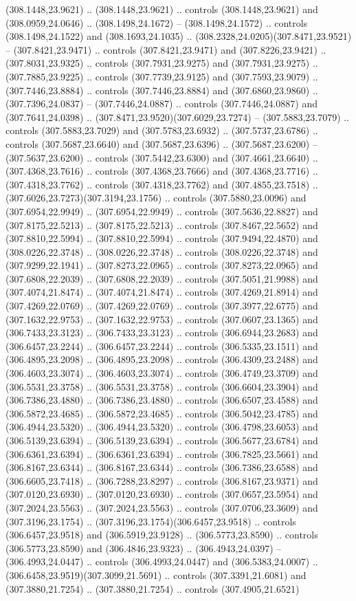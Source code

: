 (308.1448,23.9621) .. (308.1448,23.9621) .. controls (308.1448,23.9621) and (308.0959,24.0646) .. (308.1498,24.1672) -- (308.1498,24.1572) .. controls (308.1498,24.1522) and (308.1693,24.1035) .. (308.2328,24.0205)(307.8471,23.9521) -- (307.8421,23.9471) .. controls (307.8421,23.9471) and (307.8226,23.9421) .. (307.8031,23.9325) .. controls (307.7931,23.9275) and (307.7931,23.9275) .. (307.7885,23.9225) .. controls (307.7739,23.9125) and (307.7593,23.9079) .. (307.7446,23.8884) .. controls (307.7446,23.8884) and (307.6860,23.9860) .. (307.7396,24.0837) -- (307.7446,24.0887) .. controls (307.7446,24.0887) and (307.7641,24.0398) .. (307.8471,23.9520)(307.6029,23.7274) -- (307.5883,23.7079) .. controls (307.5883,23.7029) and (307.5783,23.6932) .. (307.5737,23.6786) .. controls (307.5687,23.6640) and (307.5687,23.6396) .. (307.5687,23.6200) -- (307.5637,23.6200) .. controls (307.5442,23.6300) and (307.4661,23.6640) .. (307.4368,23.7616) .. controls (307.4368,23.7666) and (307.4368,23.7716) .. (307.4318,23.7762) .. controls (307.4318,23.7762) and (307.4855,23.7518) .. (307.6026,23.7273)(307.3194,23.1756) .. controls (307.5880,23.0096) and (307.6954,22.9949) .. (307.6954,22.9949) .. controls (307.5636,22.8827) and (307.8175,22.5213) .. (307.8175,22.5213) .. controls (307.8467,22.5652) and (307.8810,22.5994) .. (307.8810,22.5994) .. controls (307.9494,22.4870) and (308.0226,22.3748) .. (308.0226,22.3748) .. controls (308.0226,22.3748) and (307.9299,22.1941) .. (307.8273,22.0965) .. controls (307.8273,22.0965) and (307.6808,22.2039) .. (307.6808,22.2039) .. controls (307.5051,21.9988) and (307.4074,21.8474) .. (307.4074,21.8474) .. controls (307.4269,21.8914) and (307.4269,22.0769) .. (307.4269,22.0769) .. controls (307.3977,22.6775) and (307.1632,22.9753) .. (307.1632,22.9753) .. controls (307.0607,23.1365) and (306.7433,23.3123) .. (306.7433,23.3123) .. controls (306.6944,23.2683) and (306.6457,23.2244) .. (306.6457,23.2244) .. controls (306.5335,23.1511) and (306.4895,23.2098) .. (306.4895,23.2098) .. controls (306.4309,23.2488) and (306.4603,23.3074) .. (306.4603,23.3074) .. controls (306.4749,23.3709) and (306.5531,23.3758) .. (306.5531,23.3758) .. controls (306.6604,23.3904) and (306.7386,23.4880) .. (306.7386,23.4880) .. controls (306.6507,23.4588) and (306.5872,23.4685) .. (306.5872,23.4685) .. controls (306.5042,23.4785) and (306.4944,23.5320) .. (306.4944,23.5320) .. controls (306.4798,23.6053) and (306.5139,23.6394) .. (306.5139,23.6394) .. controls (306.5677,23.6784) and (306.6361,23.6394) .. (306.6361,23.6394) .. controls (306.7825,23.5661) and (306.8167,23.6344) .. (306.8167,23.6344) .. controls (306.7386,23.6588) and (306.6605,23.7418) .. (306.7288,23.8297) .. controls (306.8167,23.9371) and (307.0120,23.6930) .. (307.0120,23.6930) .. controls (307.0657,23.5954) and (307.2024,23.5563) .. (307.2024,23.5563) .. controls (307.0706,23.3609) and (307.3196,23.1754) .. (307.3196,23.1754)(306.6457,23.9518) .. controls (306.6457,23.9518) and (306.5919,23.9128) .. (306.5773,23.8590) .. controls (306.5773,23.8590) and (306.4846,23.9323) .. (306.4943,24.0397) -- (306.4993,24.0447) .. controls (306.4993,24.0447) and (306.5383,24.0007) .. (306.6458,23.9519)(307.3099,21.5691) .. controls (307.3391,21.6081) and (307.3880,21.7254) .. (307.3880,21.7254) .. controls (307.4905,21.6521) 